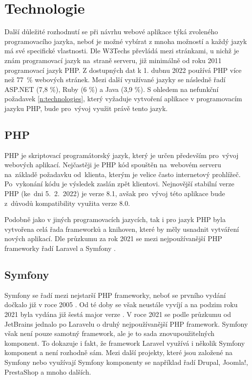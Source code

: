 \section{Technologie}
Další důležité rozhodnutí se při návrhu webové aplikace týká zvoleného programovacího jazyka, neboť je možné vybírat z mnoha možností a každý jazyk má své specifické vlastnosti. Dle W3Techs převládá mezi stránkami, u nichž je znám programovací jazyk na~straně serveru, již minimálně od roku 2011 programovací jazyk PHP. Z dostupných dat k 1. dubnu 2022 používá PHP více než 77~\% webových stránek. Mezi další využívané jazyky se následně řadí ASP.NET (7,8 \%), Ruby (6 \%) a Java (3,9 \%). \cite{php_w3techs} S ohledem na nefunkční požadavek \ref{n:technologies}, který vyžaduje vytvoření aplikace v programovacím jazyku PHP, bude pro~vývoj využit právě tento jazyk.

\subsection{PHP}
 PHP je skriptovací programátorský jazyk, který je určen především pro~vývoj webových aplikací. Nejčastěji je PHP kód spouštěn na~webovém serveru na~základě požadavku od~klienta, kterým je velice často internetový prohlížeč. Po~vykonání kódu je výsledek zaslán zpět klientovi. \cite{php_intro_1, php_intro_2} Nejnovější stabilní verze PHP (ke~dni 5.~2.~2022) je verze 8.1\cite{php_version}, avšak pro~vývoj této aplikace bude z~důvodů kompatibility využita verze 8.0.
 
 Podobně jako v jiných programovacích jazycích, tak i pro jazyk PHP byla vytvořena celá řada frameworků a knihoven, které by měly usnadnit vytváření nových aplikací. Dle průzkumu za rok 2021 se mezi nejpoužívanější PHP frameworky řadí Laravel a Symfony \cite{php_jetbrains}.
 
\subsection{Symfony}
Symfony se řadí mezi nejstarší PHP frameworky, neboť se prvního vydání dočkalo již v roce 2005 \cite{symfony_legacy}. Od té doby se však neustále vyvíjí a na podzim roku 2021 byla vydána již šestá major verze \cite{symfony_6}. V roce 2021 se podle průzkumu od JetBrains jednalo po Laravelu o druhý nejpoužívanější PHP framework\cite{php_jetbrains}. Symfony však není pouze samotný framework, ale je to sada znovupoužitelných komponent. To dokazuje i fakt, že framework Laravel využívá i několik Symfony komponent a není rozhodně sám. Mezi další projekty, které jsou založené na Symfony nebo využívají Symfony komponenty se například řadí Drupal, Joomla!, PrestaShop a mnoho dalších.\cite{symfony_projects}

